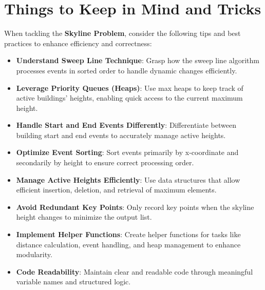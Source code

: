 \section*{Things to Keep in Mind and Tricks}

When tackling the \textbf{Skyline Problem}, consider the following tips and best practices to enhance efficiency and correctness:

\begin{itemize}
    \item \textbf{Understand Sweep Line Technique}: Grasp how the sweep line algorithm processes events in sorted order to handle dynamic changes efficiently.
    
    \item \textbf{Leverage Priority Queues (Heaps)}: Use max heaps to keep track of active buildings' heights, enabling quick access to the current maximum height.
    
    \item \textbf{Handle Start and End Events Differently}: Differentiate between building start and end events to accurately manage active heights.
    
    \item \textbf{Optimize Event Sorting}: Sort events primarily by x-coordinate and secondarily by height to ensure correct processing order.
    
    \item \textbf{Manage Active Heights Efficiently}: Use data structures that allow efficient insertion, deletion, and retrieval of maximum elements.
    
    \item \textbf{Avoid Redundant Key Points}: Only record key points when the skyline height changes to minimize the output list.
    
    \item \textbf{Implement Helper Functions}: Create helper functions for tasks like distance calculation, event handling, and heap management to enhance modularity.
    
    \item \textbf{Code Readability}: Maintain clear and readable code through meaningful variable names and structured logic.
    

\end{itemize}
